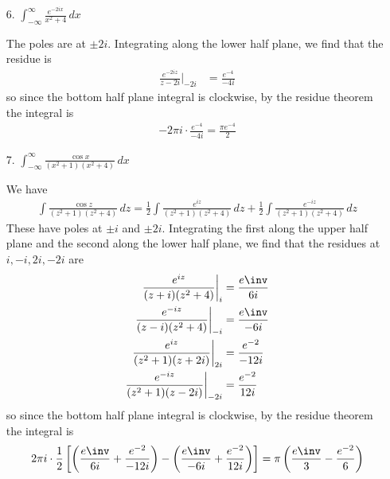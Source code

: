 \documentclass{article}
\begin{document}
\begin{itemize}
	\item[6.] $\int_{-\infty}^{\infty} \frac{e^{-2ix}}{x^2+4}\, dx$
		\begin{soln}
			The poles are at $\pm 2i.$ Integrating along the lower half plane, we find that the residue is
			\begin{align*}
				\frac{e^{-2iz}}{z-2i}\bigg\vert_{-2i} &= \frac{e^{-4}}{-4i}
			\end{align*}
			so since the bottom half plane integral is clockwise, by the residue theorem the integral is 
			\begin{align*}
				-2\pi i\cdot \frac{e^{-4}}{-4i} = \frac{\pi e^{-4}}{2}
			\end{align*}
		\end{soln}

	\item[7.] $\int_{-\infty}^\infty \frac{\cos x}{(x^2+1)(x^2+4)}\, dx$
		\begin{soln}
			We have
			\begin{align*}
				\int \frac{\cos z}{(z^2+1)(z^2+4)}\, dz = \frac{1}{2}\int \frac{e^{iz}}{(z^2+1)(z^2+4)}\, dz + \frac{1}{2} \int \frac{e^{-iz}}{(z^2+1)(z^2+4)}\, dz
			\end{align*}
			These have poles at $\pm i$ and $\pm 2i.$ Integrating the first along the upper half plane and the second along the lower half plane, we find that the residues at $i, -i, 2i, -2i$ are
			\begin{align*}
				\frac{e^{iz}}{(z+i)(z^2+4)}\bigg\vert_i &= \frac{e\inv}{6i} \\
				\frac{e^{-iz}}{(z-i)(z^2+4)}\bigg\vert_{-i} &= \frac{e\inv}{-6i} \\
				\frac{e^{iz}}{(z^2+1)(z+2i)}\bigg\vert_{2i} &= \frac{e^{-2}}{-12i} \\
				\frac{e^{-iz}}{(z^2+1)(z-2i)}\bigg\vert_{-2i} &= \frac{e^{-2}}{12i}
			\end{align*}
			so since the bottom half plane integral is clockwise, by the residue theorem the integral is
			\begin{align*}
				2\pi i \cdot \frac{1}{2} \left[ \left( \frac{e\inv}{6i} + \frac{e^{-2}}{-12i} \right) - \left( \frac{e\inv}{-6i} + \frac{e^{-2}}{12i} \right) \right] = \pi\left( \frac{e\inv}{3} - \frac{e^{-2}}{6} \right)
			\end{align*}
		\end{soln}
		
\end{itemize}
\end{document}
